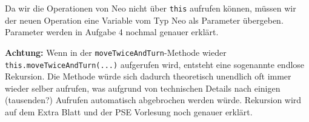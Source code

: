 \begin{Infobox}
	Da wir die Operationen von Neo nicht über \lstinline{this} aufrufen können, müssen wir der neuen Operation eine Variable vom Typ Neo als Parameter übergeben.
	Parameter werden in Aufgabe 4 nochmal genauer erklärt.\newline

	\textbf{Achtung:} Wenn in der \lstinline{moveTwiceAndTurn}-Methode wieder \lstinline{this.moveTwiceAndTurn(...)} aufgerufen wird, entsteht eine sogenannte endlose Rekursion.
	Die Methode würde sich dadurch theoretisch unendlich oft immer wieder selber aufrufen, was aufgrund von technischen Details nach einigen (tausenden?) Aufrufen automatisch abgebrochen werden würde.
	Rekursion wird auf dem Extra Blatt und der PSE Vorlesung noch genauer erklärt.

\end{Infobox}


